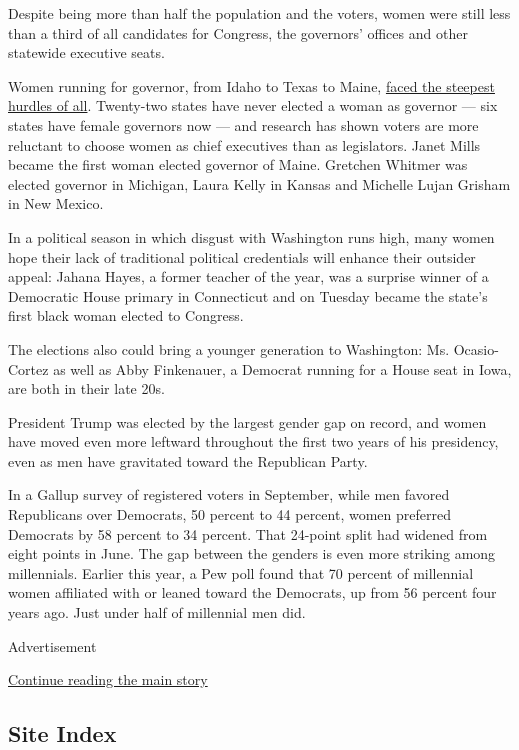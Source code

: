 Despite being more than half the population and the voters, women were
still less than a third of all candidates for Congress, the governors'
offices and other statewide executive seats.

Women running for governor, from Idaho to Texas to Maine,
\href{https://www.nytimes.com/interactive/2018/08/06/us/politics/women-governors-primaries.html?smid=fb-share\&fbclid=IwAR2lTEirDusEZmi8R2-zcuYy7h4VuHKLGL06q0HKv63QnhbDSVw8GxVr7oY}{faced
the steepest hurdles of all}. Twenty-two states have never elected a
woman as governor --- six states have female governors now --- and
research has shown voters are more reluctant to choose women as chief
executives than as legislators. Janet Mills became the first woman
elected governor of Maine. Gretchen Whitmer was elected governor in
Michigan, Laura Kelly in Kansas and Michelle Lujan Grisham in New
Mexico.

In a political season in which disgust with Washington runs high, many
women hope their lack of traditional political credentials will enhance
their outsider appeal: Jahana Hayes, a former teacher of the year, was a
surprise winner of a Democratic House primary in Connecticut and on
Tuesday became the state's first black woman elected to Congress.

The elections also could bring a younger generation to Washington: Ms.
Ocasio-Cortez as well as Abby Finkenauer, a Democrat running for a House
seat in Iowa, are both in their late 20s.

President Trump was elected by the largest gender gap on record, and
women have moved even more leftward throughout the first two years of
his presidency, even as men have gravitated toward the Republican Party.

In a Gallup survey of registered voters in September, while men favored
Republicans over Democrats, 50 percent to 44 percent, women preferred
Democrats by 58 percent to 34 percent. That 24-point split had widened
from eight points in June. The gap between the genders is even more
striking among millennials. Earlier this year, a Pew poll found that 70
percent of millennial women affiliated with or leaned toward the
Democrats, up from 56 percent four years ago. Just under half of
millennial men did.

Advertisement

\protect\hyperlink{after-bottom}{Continue reading the main story}

\hypertarget{site-index}{%
\subsection{Site Index}\label{site-index}}

